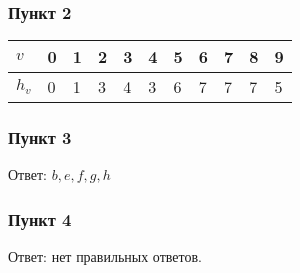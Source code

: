 \documentclass{article}
\begin{document}
	\subsubsection*{Пункт 2}
	\begin{tabular}{ | l | l | l | l | l | l | l | l | l | l | l | }
    \hline
    $v$     & 0 & 1 & 2 & 3 & 4 & 5 & 6 & 7 & 8 & 9 \\ \hline
    $h_{v}$ & 0 & 1 & 3 & 4 & 3 & 6 & 7 & 7 & 7 & 5 \\ \hline
    \end{tabular}
	
	\subsubsection*{Пункт 3} Ответ: $b, e, f, g, h$
	
	\subsubsection*{Пункт 4} Ответ: нет правильных ответов.
	
\end{document}
